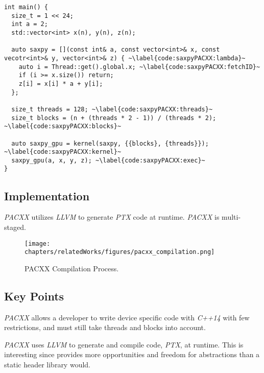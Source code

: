 \begin{lstlisting}[caption={\textit{SAXPY} implementation made with \textit{PACXX}.}, label={code:saxpyPACXX}]
int main() {
  size_t = 1 << 24;
  int a = 2;
  std::vector<int> x(n), y(n), z(n);

  auto saxpy = [](const int& a, const vector<int>& x, const vecotr<int>& y, vector<int>& z) { ~\label{code:saxpyPACXX:lambda}~
    auto i = Thread::get().global.x; ~\label{code:saxpyPACXX:fetchID}~
    if (i >= x.size()) return;
    z[i] = x[i] * a + y[i];
  };

  size_t threads = 128; ~\label{code:saxpyPACXX:threads}~
  size_t blocks = (n + (threads * 2 - 1)) / (threads * 2); ~\label{code:saxpyPACXX:blocks}~

  auto saxpy_gpu = kernel(saxpy, {{blocks}, {threads}}); ~\label{code:saxpyPACXX:kernel}~
  saxpy_gpu(a, x, y, z); ~\label{code:saxpyPACXX:exec}~
}
\end{lstlisting}

\subsection{Implementation}
\textit{PACXX} utilizes \textit{LLVM} to generate \textit{PTX} code at runtime. \textit{PACXX} is multi-staged.
\begin{figure}[H]
\center
\texttt{[image: chapters/relatedWorks/figures/pacxx\_compilation.png]}
\caption{PACXX Compilation Process.}
\label{fig:pacxxCompilation}
\end{figure}

\subsection{Key Points}
\textit{PACXX} allows a developer to write device specific code with \textit{C++14} with few restrictions, and must still take threads and blocks into account. 

\textit{PACXX} uses \textit{LLVM} to generate and compile code, \textit{PTX}, at runtime. This is interesting since provides more opportunities and freedom for abstractions than a static header library would.
